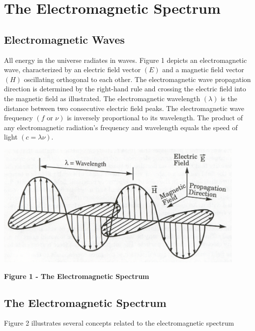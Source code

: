 \documentclass[
]{book}
\begin{document}
\hypertarget{the-electromagnetic-spectrum}{%
\chapter{The Electromagnetic Spectrum}\label{the-electromagnetic-spectrum}}

\hypertarget{electromagnetic-waves}{%
\section{Electromagnetic Waves}\label{electromagnetic-waves}}

All energy in the universe radiates in waves. Figure 1 depicts an
electromagnetic wave, characterized by an electric field vector \(\left( E \right)\) and a
magnetic field vector \(\left( H \right)\) oscillating orthogonal to each other. The
electromagnetic wave propagation direction is determined by the right-hand rule
and crossing the electric field into the magnetic field as illustrated. The
electromagnetic wavelength \(\left( \lambda \right)\) is the distance between two consecutive electric
field peaks. The electromagnetic wave frequency \(\left( f \text{ or } \nu \right)\) is inversely
proportional to its wavelength. The product of any electromagnetic radiation's
frequency and wavelength equals the speed of light \(\left( c = \lambda \nu \right)\).

\includegraphics[width=4.84043in,height=2.40625in]{media/19/image1.jpeg}

\textbf{Figure 1 - The Electromagnetic Spectrum}

\hypertarget{the-electromagnetic-spectrum-1}{%
\section{The Electromagnetic Spectrum}\label{the-electromagnetic-spectrum-1}}

Figure 2 illustrates several concepts related to the electromagnetic spectrum
\end{document}
